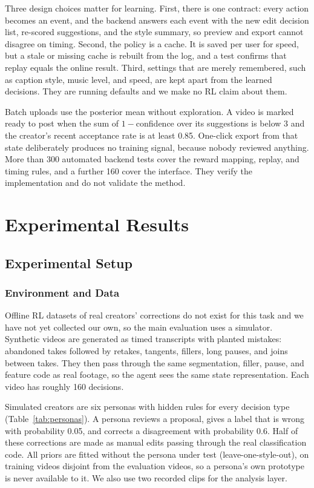 \documentclass{ieeeaccess}
\begin{document}
Three design choices matter for learning. First, there is one contract: every action becomes an event, and the backend answers each event with the new edit decision list, re-scored suggestions, and the style summary, so preview and export cannot disagree on timing. Second, the policy is a cache. It is saved per user for speed, but a stale or missing cache is rebuilt from the log, and a test confirms that replay equals the online result. Third, settings that are merely remembered, such as caption style, music level, and speed, are kept apart from the learned decisions. They are running defaults and we make no RL claim about them.

Batch uploads use the posterior mean without exploration. A video is marked ready to post when the sum of $1-$confidence over its suggestions is below 3 and the creator's recent acceptance rate is at least 0.85. One-click export from that state deliberately produces no training signal, because nobody reviewed anything. More than 300 automated backend tests cover the reward mapping, replay, and timing rules, and a further 160 cover the interface. They verify the implementation and do not validate the method.

\section{Experimental Results}
\label{sec:results}

\subsection{Experimental Setup}

\subsubsection{Environment and Data}
Offline RL datasets of real creators' corrections do not exist for this task and we have not yet collected our own, so the main evaluation uses a simulator. Synthetic videos are generated as timed transcripts with planted mistakes: abandoned takes followed by retakes, tangents, fillers, long pauses, and joins between takes. They then pass through the same segmentation, filler, pause, and feature code as real footage, so the agent sees the same state representation. Each video has roughly 160 decisions.

Simulated creators are six personas with hidden rules for every decision type (Table~\ref{tab:personas}). A persona reviews a proposal, gives a label that is wrong with probability 0.05, and corrects a disagreement with probability 0.6. Half of these corrections are made as manual edits passing through the real classification code. All priors are fitted without the persona under test (leave-one-style-out), on training videos disjoint from the evaluation videos, so a persona's own prototype is never available to it. We also use two recorded clips for the analysis layer.
\end{document}
